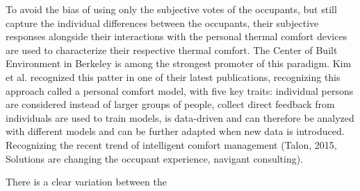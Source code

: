 To avoid the bias of using only the subjective votes of the occupants, but still capture the individual differences between the occupants, their subjective responses alongside their interactions with the personal thermal comfort devices are used to characterize their respective thermal comfort. The Center of Built Environment in Berkeley is among the strongest promoter of this paradigm. Kim et al. recognized this patter in one of their latest publications, recognizing this approach called a personal comfort model, with five key traits: individual persons are considered instead of larger groups of people, collect direct feedback from individuals are used to train models, is data-driven and can therefore be analyzed with different models and can be further adapted when new data is introduced. Recognizing the recent trend of intelligent comfort management (Talon, 2015, Solutions are changing the occupant experience, navigant consulting).



There is a clear variation between the 

